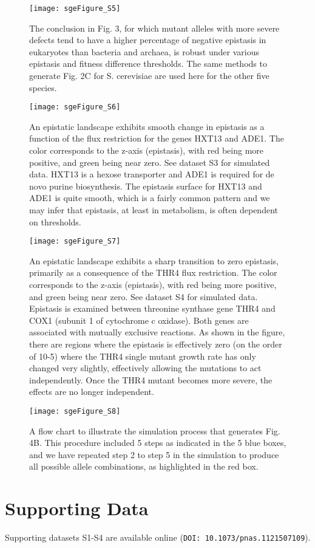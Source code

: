 \begin{figure}[!htb]
\centering
  \texttt{[image: sgeFigure\_S5]}
\caption{The conclusion in Fig. 3, for which mutant alleles with more
severe defects tend to have a higher percentage of negative epistasis
in eukaryotes than bacteria and archaea, is robust under various
epistasis and fitness difference thresholds. The same methods to
generate Fig. 2C for S. cerevisiae are used here for the other five
species.}
\label{fig:sgeS5}
\end{figure}

\begin{figure}[!htb]
\centering
  \texttt{[image: sgeFigure\_S6]}
\caption{An epistatic landscape exhibits smooth change in epistasis as
a function of the flux restriction for the genes HXT13 and ADE1. The
color corresponds to the z-axis (epistasis), with red being more
positive, and green being near zero. See dataset S3 for simulated
data. HXT13 is a hexose transporter and ADE1 is required for de novo
purine biosynthesis. The epistasis surface for HXT13 and ADE1 is quite
smooth, which is a fairly common pattern and we may infer that
epistasis, at least in metabolism, is often dependent on thresholds.}
\label{fig:sgeS6}
\end{figure}

\begin{figure}[!htb]
\centering
  \texttt{[image: sgeFigure\_S7]}
\caption{An epistatic landscape exhibits a sharp transition to zero
epistasis, primarily as a consequence of the THR4 flux
restriction. The color corresponds to the z-axis (epistasis), with red
being more positive, and green being near zero. See dataset S4 for
simulated data. Epistasis is examined between threonine synthase gene
THR4 and COX1 (subunit 1 of cytochrome c oxidase). Both genes are
associated with mutually exclusive reactions. As shown in the figure,
there are regions where the epistasis is effectively zero (on the
order of 10-5) where the THR4 single mutant growth rate has only
changed very slightly, effectively allowing the mutations to act
independently. Once the THR4 mutant becomes more severe, the effects
are no longer independent.}
\label{fig:sgeS7}
\end{figure}

\begin{figure}[!htb]
\centering
  \texttt{[image: sgeFigure\_S8]}
\caption{A flow chart to illustrate the simulation process that
generates Fig. 4B. This procedure included 5 steps as indicated in the
5 blue boxes, and we have repeated step 2 to step 5 in the simulation
to produce all possible allele combinations, as highlighted in the red
box.}
\label{fig:sgeS8}
\end{figure}

\section{Supporting Data}

Supporting datasets S1-S4 are available online (\texttt{DOI:
10.1073/pnas.1121507109}).